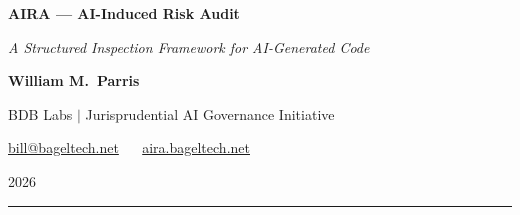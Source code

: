 \documentclass[11pt]{article}
\begin{document}
\begin{titlepage}
  \vspace*{2cm}
  {\Huge\bfseries\color{aira-blue} AIRA --- AI-Induced Risk Audit\par}
  \vspace{0.5em}
  {\Large\itshape A Structured Inspection Framework for AI-Generated Code\par}
  \vspace{2em}
  {\large \textbf{William M.~Parris}\par}
  \vspace{0.4em}
  {\normalsize BDB Labs $\mid$ Jurisprudential AI Governance Initiative\par}
  {\normalsize \href{mailto:bill@bageltech.net}{bill@bageltech.net} $\quad$ \href{https://aira.bageltech.net}{aira.bageltech.net}\par}
  \vspace{0.4em}
  {\normalsize 2026\par}
  \vspace{2em}
  \noindent\rule{\textwidth}{0.4pt}
\end{titlepage}
\end{document}
